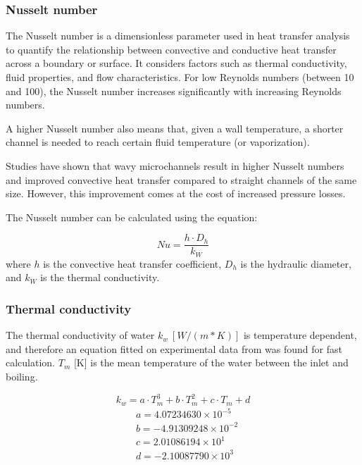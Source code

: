 \documentclass{homework}
\begin{document}
\begin{multicols}{2}
\subsubsection{Nusselt number}
    
    The Nusselt number is a dimensionless parameter used in heat transfer analysis to quantify the relationship between convective and conductive heat transfer across a boundary or surface.  
    It considers factors such as thermal conductivity, fluid properties, and flow characteristics. For low Reynolds numbers (between 10 and 100), the Nusselt number increases significantly with increasing Reynolds numbers.  
    
    A higher Nusselt number also means that, given a wall temperature, a shorter channel is needed to reach certain fluid temperature (or vaporization).  
    
    Studies have shown that wavy microchannels result in higher Nusselt numbers and improved convective heat transfer compared to straight channels of the same size. However, this improvement comes at the cost of increased pressure losses.   
    
    The Nusselt number can be calculated using the equation:  
    
    $$N u=\frac{h \cdot D_h}{k_W}$$ 		    
    where $h$ is the convective heat transfer coefficient, $D_h$ is the hydraulic diameter, and $k_W$ is the thermal conductivity.  
    
\subsubsection{Thermal conductivity}
    
    The thermal conductivity of water $k_w \ [W/(m*K)] $ is temperature dependent, and therefore an equation fitted on experimental data from \cite{EngineeringToolBox__conductivity} was found for fast calculation. $T_{m}$ [K] is the mean temperature of the water between the inlet and boiling.   
    
    $$
    k_w=a \cdot T_{m}^3+b \cdot T_{m}^2+c \cdot T_{m}+d
    $$ 		    
    $$
    \begin{aligned}
    & a=4.07234630 \times 10^{-5} \\
    & b=-4.91309248 \times 10^{-2} \\
    & c=2.01086194 \times 10^1 \\
    & d=-2.10087790 \times 10^3
    \end{aligned}
    $$ 		  
    

\end{multicols}
\end{document}
